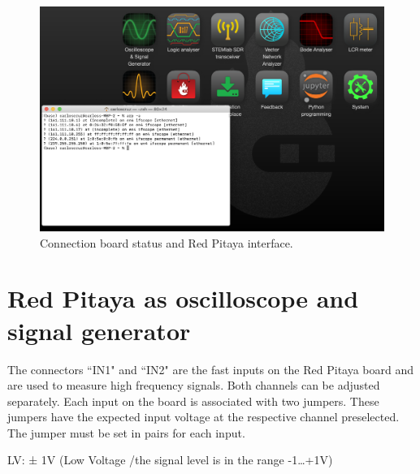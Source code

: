 \documentclass[12pt]{extarticle}
\begin{document}
\begin{figure}[!h]
	\begin{center}
		\includegraphics[width=1\textwidth]{images2/connect-check} 
		\caption{Connection board status and Red Pitaya interface.}
		\label{fig:connect}
	\end{center}
\end{figure}





\section{Red Pitaya as oscilloscope and signal generator}

The connectors ``IN1" and ``IN2" are the fast inputs on the Red Pitaya board and are used to measure high frequency signals. Both channels can be adjusted separately. Each input on the board is associated with two jumpers. These jumpers have the expected input voltage at the respective channel preselected. The jumper must be set in pairs for each input. 

LV: ± 1V (Low Voltage /the  signal level is in the range -1…+1V)
\end{document}
